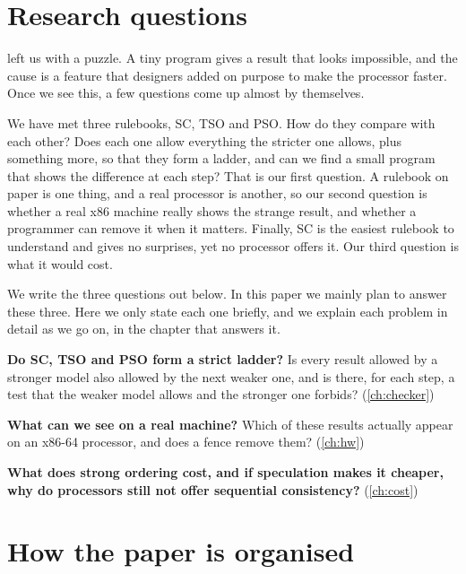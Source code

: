 \section{Research questions}
\label{sec:rq}

 left us with a puzzle. A tiny program gives a result that looks impossible, and the cause is a feature that designers added on purpose to make the processor faster. Once we see this, a few questions come up almost by themselves.

We have met three rulebooks, SC, TSO and PSO. How do they compare with each other? Does each one allow everything the stricter one allows, plus something more, so that they form a ladder, and can we find a small program that shows the difference at each step? That is our first question. A rulebook on paper is one thing, and a real processor is another, so our second question is whether a real x86 machine really shows the strange result, and whether a programmer can remove it when it matters. Finally, SC is the easiest rulebook to understand and gives no surprises, yet no processor offers it. Our third question is what it would cost.

We write the three questions out below. In this paper we mainly plan to answer these three. Here we only state each one briefly, and we explain each problem in detail as we go on, in the chapter that answers it.

\begin{description}[leftmargin=1.2cm,style=nextline]
\item[Q1] \textbf{Do SC, TSO and PSO form a strict ladder?} Is every result allowed by a stronger model also allowed by the next weaker one, and is there, for each step, a test that the weaker model allows and the stronger one forbids? (\cref{ch:checker})
\item[Q2] \textbf{What can we see on a real machine?} Which of these results actually appear on an x86-64 processor, and does a fence remove them? (\cref{ch:hw})
\item[Q3] \textbf{What does strong ordering cost, and if speculation makes it cheaper, why do processors still not offer sequential consistency?} (\cref{ch:cost})
\end{description}

\section{How the paper is organised}

